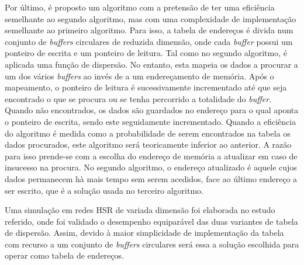 Por último, é proposto um algoritmo com a pretensão de ter uma eficiência semelhante ao segundo algoritmo, mas com uma complexidade de implementação semelhante ao primeiro algoritmo. Para isso, a tabela de endereços é divida num conjunto de \textit{buffers} circulares de reduzida dimensão, onde cada \textit{buffer} possui um ponteiro de escrita e um ponteiro de leitura. Tal como no segundo algoritmo, é aplicada uma função de dispersão. No entanto, esta mapeia os dados a procurar a um dos vários \textit{buffers} ao invés de a um endereçamento de memória. Após o mapeamento, o ponteiro de leitura é sucessivamente incrementado até que seja encontrado o que se procura ou se tenha percorrido a totalidade do \textit{buffer}. Quando não encontrados, os dados são guardados no endereço para o qual aponta o ponteiro de escrita, sendo este seguidamente incrementado. Quando a eficiência do algoritmo é medida como a probabilidade de serem encontrados na tabela os dados procurados, este algoritmo será teoricamente inferior ao anterior. A razão para isso prende-se com a escolha do endereço de memória a atualizar em caso de insucesso na procura. No segundo algoritmo, o endereço atualizado é aquele cujos dados permanecem hà mais tempo sem serem acedidos, face ao último endereço a ser escrito, que é a solução usada no terceiro algoritmo. 
\par Uma simulação em redes HSR de variada dimensão foi elaborada no estudo referido, onde foi validado o desempenho equiparável das duas variantes de tabela de dispersão. Assim, devido à maior simplicidade de implementação da tabela com recurso a um conjunto de \textit{buffers} circulares será essa a solução escolhida para operar como tabela de endereços.



